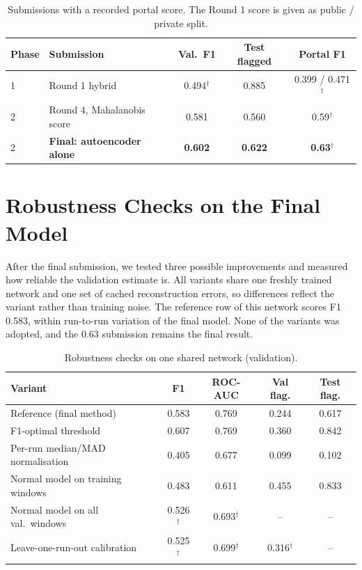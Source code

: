 \documentclass[runningheads]{llncs}
\newcommand{\doc}{$^\dagger$}
\begin{document}
\begin{table}[ht]
\centering
\caption{Submissions with a recorded portal score. The Round 1 score is given as public / private split.}\label{tab:portal}
\begin{tabular}{|l|l|c|c|c|}
\hline
Phase & Submission & Val.\ F1 & Test flagged & Portal F1 \\
\hline
1 & Round 1 hybrid & 0.494\doc & 0.885 & 0.399 / 0.471\doc \\
2 & Round 4, Mahalanobis score & 0.581 & 0.560 & 0.59\doc \\
2 & \textbf{Final: autoencoder alone} & \textbf{0.602} & \textbf{0.622} & \textbf{0.63}\doc \\
\hline
\end{tabular}
\end{table}

\section{Robustness Checks on the Final Model}\label{sec:robust}

After the final submission, we tested three possible improvements and measured how reliable the validation estimate is. All variants share one freshly trained network and one set of cached reconstruction errors, so differences reflect the variant rather than training noise. The reference row of this network scores F1 0.583, within run-to-run variation of the final model. None of the variants was adopted, and the 0.63 submission remains the final result.

\begin{table}[ht]
\centering
\caption{Robustness checks on one shared network (validation).}\label{tab:robust}
\begin{tabular}{|l|c|c|c|c|}
\hline
Variant & F1 & ROC-AUC & Val flag. & Test flag. \\
\hline
Reference (final method) & 0.583 & 0.769 & 0.244 & 0.617 \\
F1-optimal threshold & 0.607 & 0.769 & 0.360 & 0.842 \\
Per-run median/MAD normalisation & 0.405 & 0.677 & 0.099 & 0.102 \\
Normal model on training windows & 0.483 & 0.611 & 0.455 & 0.833 \\
Normal model on all val.\ windows & 0.526\doc & 0.693\doc & -- & -- \\
Leave-one-run-out calibration & 0.525\doc & 0.699\doc & 0.316\doc & -- \\
\hline
\end{tabular}
\end{table}
\end{document}
